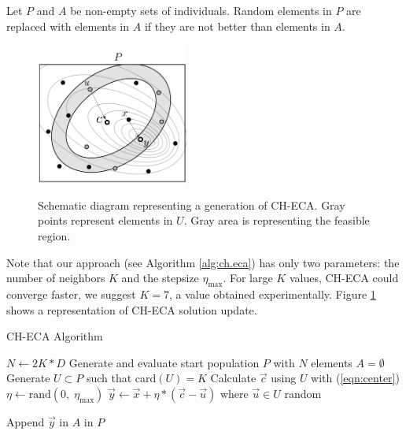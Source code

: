 \documentclass[conference]{IEEEtran}
\begin{document}
Let $P$ and $A$  be  non-empty sets of individuals. Random elements in $P$ are 
replaced with elements in $A$ if they are not better than elements in $A$.

\begin{figure}[!ht]
	\centering
	\includegraphics[width=5cm]{img/ecaG.pdf}
	\caption{Schematic diagram representing a generation of CH-ECA. Gray points %
	represent elements in $U$. Gray area is representing the feasible region.}
	\label{fig:ecag}       %
\end{figure}

Note that our approach (see Algorithm \ref{alg:ch.eca}) has only two parameters: 
the number of neighbors $K$ and  the stepsize $\eta_{\max}$.  For large $K$ values, 
CH-ECA could converge  faster, we suggest $K = 7$, a value obtained experimentally. 
Figure \ref{fig:ecag} shows a representation of CH-ECA solution update. 

\begin{algorithm}[!ht]
	\caption{CH-ECA Algorithm}
	\label{alg:ch.eca}
	\begin{algorithmic}[1]
 		\renewcommand{\algorithmicrequire}{\textbf{Input:}}
 		\renewcommand{\algorithmicensure}{\textbf{Output:}}
		\STATE $N \gets 2K * D$
		\STATE Generate and evaluate start population $P$ with $N$ elements
			\STATE $A = \emptyset$
				\STATE Generate $U \subset P$ such that  card$(U) = K$
				\STATE Calculate $\vec{c}$ using $U$ with (\ref{eqn:center})
				\STATE $\eta \gets \text{rand}(0,\; \eta_{\max}) $ 
				\STATE $\vec{y} \gets \vec{x} + \eta  * (\vec{c} - \vec{u}) $ %
						where $ \vec{u} \in U $ random
				
					\STATE Append $\vec{y} $ in $A$
				\ENDIF
			\ENDFOR
		\ENDWHILE
		 in $P$
	\end{algorithmic}
\end{algorithm}
\end{document}
